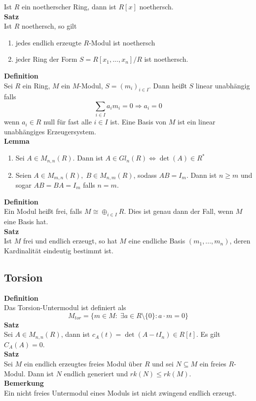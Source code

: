 \documentclass[a4paper, 12pt]{article}
\begin{document}
Ist $R$ ein noetherscher Ring, dann ist $R[x]$ noethersch.\\
\textbf{Satz}\\
Ist $R$ noethersch, so gilt \begin{enumerate}
	\item jedes endlich erzeugte $R$-Modul ist noethersch
	\item jeder Ring der Form $S = R[x_1,...,x_n]/R$ ist noethersch.
\end{enumerate}
\textbf{Definition}\\
Sei $R$ ein Ring, $M$ ein $M$-Modul, $S = (m_i)_{i\in I}$. Dann heißt $S$ linear unabhängig falls \[\sum_{i \in I}a_i m_i = 0 \Rightarrow a_i = 0\] wenn $a_i \in R$ null für fast alle $i \in I$ ist. Eine Basis von $M$ ist ein linear unabhängiges Erzeugersystem.\\
\textbf{Lemma}\\
\begin{enumerate}
	\item Sei $A \in M_{n,n}(R)$. Dann ist $A \in Gl_n(R) \Leftrightarrow \det(A) \in R^*$
	\item Seien $A \in M_{m,n}(R), \; B \in M_{n,m}(R)$, sodass $AB = I_m$. Dann ist $n \geq m$ und sogar $AB=BA=I_m$ falls $n=m$.
\end{enumerate}
\textbf{Definition}\\
Ein Modul heißt frei, falls $M \cong \oplus_{i \in I} R$. Dies ist genau dann der Fall, wenn $M$ eine Basis hat.\\
\textbf{Satz}\\
Ist $M$ frei und endlich erzeugt, so hat $M$ eine endliche Basis $(m_1,...,m_n)$, deren Kardinalität eindeutig bestimmt ist.
\subsection{Torsion}
\textbf{Definition}\\
Das Torsion-Untermodul ist definiert als \[M_{tor} = \{m \in M: \; \exists a \in R\setminus \{0\}: a\cdot m = 0\}\]
\textbf{Satz}\\
Sei $A \in M_{n,n}(R)$, dann ist $c_A(t) = \det(A-tI_n) \in R[t]$. Es gilt $C_A(A) = 0$.\\
\textbf{Satz}\\
Sei $M$ ein endlich erzeugtes freies Modul über $R$ und sei $N \subseteq M$ ein freies $R$-Modul. Dann ist $N$ endlich generiert und $rk(N)\leq rk(M)$.\\
\textbf{Bemerkung}\\
Ein nicht freies Untermodul eines Moduls ist nicht zwingend endlich erzeugt.
\end{document}
